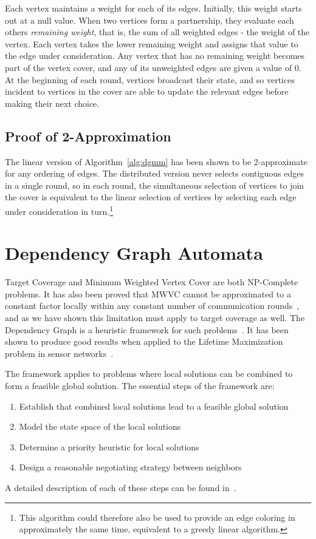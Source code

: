 Each vertex maintains a weight for each of its edges. Initially, this weight starts out at a null value. When two vertices form a partnership, they evaluate each others {\em remaining weight}, that is, the sum of all weighted edges - the weight of the vertex. Each vertex takes the lower remaining weight and assigns that value to the edge under consideration. Any vertex that has no remaining weight becomes part of the vertex cover, and any of its unweighted edges are given a value of 0. At the beginning of each round, vertices broadcast their state, and so vertices incident to vertices in the cover are able to update the relevant edges before making their next choice.



\subsection{Proof of 2-Approximation}
The linear version of Algorithm~\ref{alg:dgmm} has been shown to be 2-approximate for any ordering of edges. The distributed version never selects contiguous edges in a single round, so in each round, the simultaneous selection of vertices to join the cover is equivalent to the linear selection of vertices by selecting each edge under consideration in turn.\footnote{This algorithm could therefore also be used to provide an edge coloring in approximately the same time, equivalent to a greedy linear algorithm.}

\section{Dependency Graph Automata}
\label{sec:life-depend}
Target Coverage and Minimum Weighted Vertex Cover are both NP-Complete problems. It has also been proved that MWVC cannot be approximated to a constant factor locally within any constant number of communication rounds~\cite{1011811}, and as we have shown this limitation must apply to target coverage as well. The Dependency Graph is a heuristic framework for such problems~\cite{IPDPS.2008.45361}. It has been shown to produce good results when applied to the Lifetime Maximization problem in sensor networks~\cite{978-3-540-89894-8_26}.

The framework applies to problems where local solutions can be combined to form a feasible global solution. The essential steps of the framework are: 
\begin{enumerate}
\item Establish that combined local solutions lead to a feasible global solution
\item Model the state space of the local solutions
\item Determine a priority heuristic for local solutions
\item Design a reasonable negotiating strategy between neighbors
\end{enumerate} 
A detailed description of each of these steps can be found in~\cite{IPDPS.2008.45361}.


